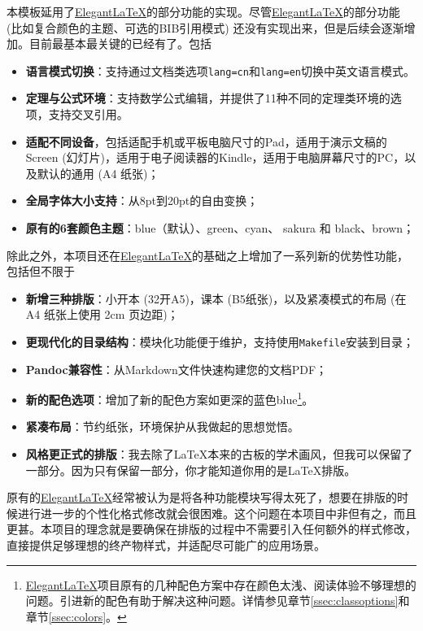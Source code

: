本模板延用了\href{https://github.com/ElegantLaTeX/}{Elegant\LaTeX}的部分功能的实现。尽管\href{https://github.com/ElegantLaTeX/}{Elegant\LaTeX}的部分功能 (比如复合颜色的主题、可选的BIB引用模式) 还没有实现出来，但是后续会逐渐增加。目前最基本最关键的已经有了。包括
\begin{itemize}
  \item \textbf{语言模式切换}：支持通过文档类选项\texttt{lang=cn}和\texttt{lang=en}切换中英文语言模式。
  \item \textbf{定理与公式环境}：支持数学公式编辑，并提供了11种不同的定理类环境的选项，支持交叉引用。
  \item \textbf{适配不同设备}，包括适配手机或平板电脑尺寸的Pad，适用于演示文稿的Screen (幻灯片)，适用于电子阅读器的Kindle，适用于电脑屏幕尺寸的PC，以及默认的通用 (A4 纸张)；
  \item \textbf{全局字体大小支持}：从8pt到20pt的自由变换；
  \item \textbf{原有的6套颜色主题}：\textcolor{elegantblue}{blue}（默认）、\textcolor{elegantgreen}{green}、\textcolor{elegantcyan}{cyan}、 \textcolor{elegantsakura}{sakura} 和 \textcolor{elegantblack}{black}、\textcolor{elegantbrown}{brown}；
\end{itemize}

除此之外，本项目还在\href{https://github.com/ElegantLaTeX/}{Elegant\LaTeX}的基础之上增加了一系列新的优势性功能，包括但不限于
\begin{itemize}
  \item \textbf{新增三种排版}：小开本 (32开A5)，课本 (B5纸张)，以及紧凑模式的布局 (在 A4 纸张上使用 2cm 页边距)；
  \item \textbf{更现代化的目录结构}：模块化功能便于维护，支持使用\texttt{Makefile}安装到目录；
  \item \textbf{Pandoc兼容性}：从Markdown文件快速构建您的文档PDF；
  \item \textbf{新的配色选项}：增加了新的配色方案如更深的蓝色\textcolor{eblue}{blue}\footnote{\href{https://github.com/ElegantLaTeX/}{Elegant\LaTeX}项目原有的几种配色方案中存在颜色太浅、阅读体验不够理想的问题。引进新的配色有助于解决这种问题。详情参见章节\ref{ssec:classoptions}和章节\ref{ssec:colors}。}。
  \item \textbf{紧凑布局}：节约纸张，环境保护从我做起的思想觉悟。
  \item \textbf{风格更正式的排版}：我去除了\LaTeX{}本来的古板的学术画风，但我可以保留了一部分。因为只有保留一部分，你才能知道你用的是\LaTeX{}排版。
\end{itemize}

\begin{remark}
  原有的\href{https://github.com/ElegantLaTeX/}{Elegant\LaTeX}经常被认为是将各种功能模块写得太死了，想要在排版的时候进行进一步的个性化格式修改就会很困难。这个问题在本项目中非但有之，而且更甚。本项目的理念就是要确保在排版的过程中不需要引入任何额外的样式修改，直接提供足够理想的终产物样式，并适配尽可能广的应用场景。
\end{remark}